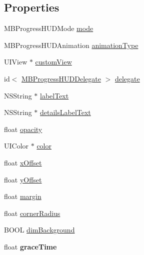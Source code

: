 \subsection*{Properties}
\begin{DoxyCompactItemize}
\item 
M\+B\+Progress\+H\+U\+D\+Mode \hyperlink{interface_m_b_progress_h_u_d_ace77eaaf507e86fe56436f7ee7b6fdc9}{mode}
\item 
M\+B\+Progress\+H\+U\+D\+Animation \hyperlink{interface_m_b_progress_h_u_d_a71d04bb9e2839df9377ad10d03b2e468}{animation\+Type}
\item 
U\+I\+View $\ast$ \hyperlink{interface_m_b_progress_h_u_d_a78f89e05d797a46bf9b41a5dfd1f5d4a}{custom\+View}
\item 
id$<$ \hyperlink{protocol_m_b_progress_h_u_d_delegate-p}{M\+B\+Progress\+H\+U\+D\+Delegate} $>$ \hyperlink{interface_m_b_progress_h_u_d_ad6fee32939fa55fc1a341aba117aa28f}{delegate}
\item 
N\+S\+String $\ast$ \hyperlink{interface_m_b_progress_h_u_d_a531706887f08881c7f13b4309521b299}{label\+Text}
\item 
N\+S\+String $\ast$ \hyperlink{interface_m_b_progress_h_u_d_a8b7cbf551fc551c64159b7a3f648c6ac}{details\+Label\+Text}
\item 
float \hyperlink{interface_m_b_progress_h_u_d_a24ab5e37917e3489d6add081324a49ff}{opacity}
\item 
U\+I\+Color $\ast$ \hyperlink{interface_m_b_progress_h_u_d_a1f4ab0f3ddc52af9353a4cf225ad1361}{color}
\item 
float \hyperlink{interface_m_b_progress_h_u_d_a4e6ee114c04b90ced1a253a6d33ba785}{x\+Offset}
\item 
float \hyperlink{interface_m_b_progress_h_u_d_ad526ffcabab5131697eb0850c50ab1f4}{y\+Offset}
\item 
float \hyperlink{interface_m_b_progress_h_u_d_a4126e72234f8afcb87905a9ed65c022c}{margin}
\item 
float \hyperlink{interface_m_b_progress_h_u_d_a8a3573dbf4dcdeeb187a08d0070e811c}{corner\+Radius}
\item 
B\+O\+O\+L \hyperlink{interface_m_b_progress_h_u_d_ab781ccd4428c8eff6907d2cdc90fc3ee}{dim\+Background}
\item 
\hypertarget{interface_m_b_progress_h_u_d_a6f837c351a405d0bb6ec05856d7776dd}{float {\bfseries grace\+Time}}\label{interface_m_b_progress_h_u_d_a6f837c351a405d0bb6ec05856d7776dd}


\end{DoxyCompactItemize}

